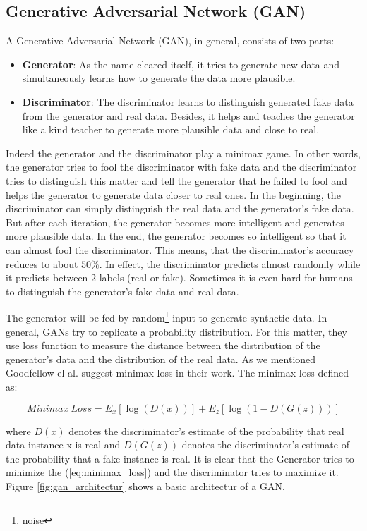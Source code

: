 \subsection{Generative Adversarial Network (GAN)}
A Generative Adversarial Network (GAN), in general, consists of two parts:
\begin{itemize}
  \item \textbf{Generator}: As the name cleared itself, it tries to generate new data and simultaneously learns how to generate the data more plausible.
  \item \textbf{Discriminator}: The discriminator learns to distinguish generated fake data from the generator and real data. Besides, it helps and teaches the generator like a kind teacher to generate more plausible data and close to real.
\end{itemize}

Indeed the generator and the discriminator play a minimax game. In other words, the generator
tries to fool the discriminator with fake data and the discriminator tries to distinguish this
matter and tell the generator that he failed to fool and helps the generator to generate data
closer to real ones. In the beginning, the discriminator can simply distinguish the real data and
the generator's fake data. But after each iteration, the generator becomes more intelligent and
generates more plausible data.  In the end, the generator becomes so intelligent so that it can
almost fool the discriminator. This means, that the discriminator's accuracy reduces to about
$50\%$. In effect, the discriminator predicts almost randomly while it predicts between $2$ labels
(real or fake). Sometimes it is even hard for humans to distinguish the
generator's fake data and real data.

The generator will be fed by random\footnote{noise}
 input to generate synthetic data. In general, GANs try to replicate a probability distribution. For this matter, they use loss function to measure the distance between the distribution of the generator's data and the distribution of the real data. As we mentioned Goodfellow el al. \cite{Same} suggest minimax loss in their work. The minimax loss defined as: 

\begin{equation} \label{eq:minimax_loss}
  Minimax\ Loss = E_{x}[\log (D(x))]+E_{z}[\log (1-D(G(z)))]
\end{equation}


where $D(x)$  denotes the discriminator's estimate of the probability that real data instance x is
real and $D(G(z))$ denotes the discriminator's estimate of the probability that a fake instance is
real. It is clear that the Generator tries to minimize the (\ref{eq:minimax_loss}) and the
discriminator tries to maximize it. Figure \ref{fig:gan_architectur} shows a basic architectur of a
GAN. 

